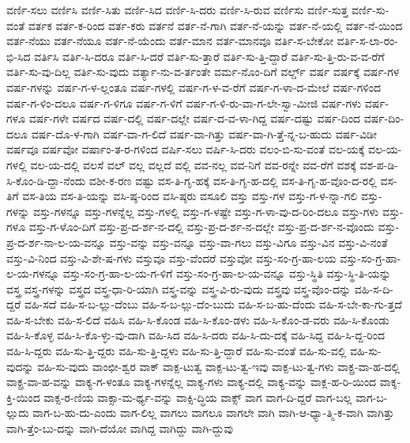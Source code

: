 {ವರ್ಣಿ-ಸಲು
ವರ್ಣಿಸಿ
ವರ್ಣಿ-ಸಿತು
ವರ್ಣಿ-ಸಿದ
ವರ್ಣಿ-ಸಿ-ದರು
ವರ್ಣಿ-ಸಿ-ರುವ
ವರ್ಣಿಸು
ವರ್ಣಿ-ಸುತ್ತ
ವರ್ಣಿ-ಸು-ವಂತೆ
ವರ್ತಕ
ವರ್ತ-ಕ-ರಿಂದ
ವರ್ತ-ಕರು
ವರ್ತನೆ
ವರ್ತ-ನೆ-ಗಾಗಿ
ವರ್ತ-ನೆ-ಯನ್ನು
ವರ್ತ-ನೆ-ಯಲ್ಲಿ
ವರ್ತ-ನೆ-ಯಿಂದ
ವರ್ತ-ನೆಯು
ವರ್ತ-ನೆಯೂ
ವರ್ತ-ನೆ-ಯೆಂದು
ವರ್ತ-ಮಾನ
ವರ್ತ-ಮಾನವೂ
ವರ್ತಿ-ಸ-ಬೇಕೋ
ವರ್ತಿ-ಸ-ಲಾ-ರಂ-ಭಿ-ಸಿದ
ವರ್ತಿಸಿ
ವರ್ತಿ-ಸಿ-ದರೂ
ವರ್ತಿ-ಸಿ-ದರೆ
ವರ್ತಿ-ಸು-ತ್ತಾರೆ
ವರ್ತಿ-ಸು-ತ್ತಿ-ದ್ದಾರೆ
ವರ್ತಿ-ಸು-ತ್ತಿ-ರು-ವ-ವ-ರೆಗೆ
ವರ್ತಿ-ಸು-ವು-ದಿಲ್ಲ
ವರ್ತಿ-ಸು-ವುದು
ವರ್ತ್ಯಾ-ನು-ವ-ರ್ತಂತೇ
ವರ್ಮ-ನೊಂ-ದಿಗೆ
ವರ್ಲ್ಡ್
ವರ್ಷ
ವರ್ಷಕ್ಕೆ
ವರ್ಷ-ಗಳ
ವರ್ಷ-ಗಳನ್ನು
ವರ್ಷ-ಗ-ಳ-ಲ್ಲಂತೂ
ವರ್ಷ-ಗಳಲ್ಲಿ
ವರ್ಷ-ಗ-ಳ-ವ-ರೆಗೆ
ವರ್ಷ-ಗ-ಳಾ-ದ-ಮೇಲೆ
ವರ್ಷ-ಗಳಿಂದ
ವರ್ಷ-ಗ-ಳಿಂ-ದಲೂ
ವರ್ಷ-ಗ-ಳಿಗೂ
ವರ್ಷ-ಗ-ಳಿಗೆ
ವರ್ಷ-ಗ-ಳಿ-ರು-ವಾ-ಗ-ಲೇ-ಸ್ವಾ-ಮೀಜಿ
ವರ್ಷ-ಗಳು
ವರ್ಷ-ಗಳೂ
ವರ್ಷ-ಗಳೇ
ವರ್ಷದ
ವರ್ಷ-ದಲ್ಲಿ
ವರ್ಷ-ದಲ್ಲೇ
ವರ್ಷ-ದ-ವ-ಳಾ-ಗಿದ್ದ
ವರ್ಷ-ದಷ್ಟು
ವರ್ಷ-ದಿಂದ
ವರ್ಷ-ದಿಂ-ದಲೂ
ವರ್ಷ-ದೊ-ಳ-ಗಾಗಿ
ವರ್ಷ-ವಾ-ಗ-ಲಿದೆ
ವರ್ಷ-ವಾ-ಗಿತ್ತು
ವರ್ಷ-ವಾ-ಗಿ-ತ್ತೆ-ನ್ನ-ಬ-ಹುದು
ವರ್ಷ-ವಿಡೀ
ವರ್ಷವೂ
ವರ್ಷವೋ
ವರ್ಷಾಂ-ತ-ರ-ಗಳಿಂದ
ವರ್ಷಿ-ಸಲು
ವರ್ಷಿ-ಸಿ-ದರು
ವಲಂ-ಬಿ-ಸು-ವಂತೆ
ವಲ-ಯಕ್ಕೆ
ವಲ-ಯ-ಗಳಲ್ಲಿ
ವಲ-ಯ-ದಲ್ಲಿ
ವಲಸೆ
ವಲ್
ವಲ್ಲ
ವಲ್ಲದೆ
ವಲ್ಲಿ
ವವ-ನಲ್ಲ
ವವ-ನಿಗೆ
ವವ-ರನ್ನೇ
ವವ-ರೆಗೆ
ವಶಕ್ಕೆ
ವಶ-ಪ-ಡಿ-ಸಿ-ಕೊಂ-ಡಿ-ದ್ದಾ-ನೆಂದು
ವಶೀ-ಕ-ರಣ
ವಷ್ಟು
ವಸ-ತಿ-ಗೃ-ಹಕ್ಕೆ
ವಸ-ತಿ-ಗೃ-ಹ-ದಲ್ಲಿ
ವಸ-ತಿ-ಗೃ-ಹ-ವೊಂ-ದ-ರಲ್ಲಿ
ವಸ-ತಿಗೆ
ವಸ-ತಿಯ
ವಸ-ತಿ-ಯನ್ನು
ವಸಿ-ಷ್ಠ-ರಿಂದ
ವಸಿ-ಷ್ಠರು
ವಸೂಲಿ
ವಸ್ತು
ವಸ್ತು-ಗಳ
ವಸ್ತು-ಗ-ಳ-ನ್ನಾ-ಗಲಿ
ವಸ್ತು-ಗಳನ್ನು
ವಸ್ತು-ಗಳನ್ನೂ
ವಸ್ತು-ಗಳನ್ನೆಲ್ಲ
ವಸ್ತು-ಗಳಲ್ಲಿ
ವಸ್ತು-ಗ-ಳಷ್ಟೇ
ವಸ್ತು-ಗ-ಳಾ-ವು-ದ-ರಿಂ-ದಲೂ
ವಸ್ತು-ಗಳು
ವಸ್ತು-ಗಳೂ
ವಸ್ತು-ಗ-ಳೊಂ-ದಿಗೆ
ವಸ್ತು-ಪ್ರ-ದ-ರ್ಶ-ನ-ದಲ್ಲಿ
ವಸ್ತು-ಪ್ರ-ದ-ರ್ಶ-ನ-ದಲ್ಲೇ
ವಸ್ತು-ಪ್ರ-ದ-ರ್ಶ-ನ-ವೊಂದು
ವಸ್ತು-ಪ್ರ-ದ-ರ್ಶ-ನಾ-ಲ-ಯ-ವನ್ನೂ
ವಸ್ತು-ವನ್ನು
ವಸ್ತು-ವನ್ನೂ
ವಸ್ತು-ವಾ-ಗಲು
ವಸ್ತು-ವಿಗೂ
ವಸ್ತು-ವಿನ
ವಸ್ತು-ವಿ-ನಂತೆ
ವಸ್ತು-ವಿ-ನಿಂದ
ವಸ್ತು-ವಿ-ಶೇ-ಷ-ಗಳು
ವಸ್ತುವೂ
ವಸ್ತು-ವೆಂದರೆ
ವಸ್ತುವೋ
ವಸ್ತು-ಸಂ-ಗ್ರ-ಹಾ-ಲಯ
ವಸ್ತು-ಸಂ-ಗ್ರ-ಹಾ-ಲ-ಯ-ಗಳನ್ನೂ
ವಸ್ತು-ಸಂ-ಗ್ರ-ಹಾ-ಲ-ಯ-ಗ-ಳಿಗೆ
ವಸ್ತು-ಸಂ-ಗ್ರ-ಹಾ-ಲ-ಯ-ವನ್ನೂ
ವಸ್ತು-ಸ್ಥಿತಿ
ವಸ್ತು-ಸ್ಥಿ-ತಿ-ಯನ್ನು
ವಸ್ತ್ರ
ವಸ್ತ್ರ-ಗಳನ್ನು
ವಸ್ತ್ರದ
ವಸ್ತ್ರ-ಧಾ-ರಿ-ಯಾಗಿ
ವಸ್ತ್ರ-ವನ್ನು
ವಸ್ತ್ರ-ವಿ-ರು-ವುದು
ವಸ್ತ್ರವು
ವಸ್ತ್ರ-ವೊಂ-ದನ್ನು
ವಹಿ-ಸ-ದಿ-ದ್ದರೆ
ವಹಿ-ಸದೆ
ವಹಿ-ಸ-ಬ-ಲ್ಲು-ದೆಂಬು
ವಹಿ-ಸ-ಬ-ಲ್ಲು-ದೆಂ-ಬುದು
ವಹಿ-ಸ-ಬ-ಹು-ದೆಂದು
ವಹಿ-ಸ-ಬೇ-ಕಾ-ಗು-ತ್ತದೆ
ವಹಿ-ಸ-ಬೇಕು
ವಹಿ-ಸ-ಲಿದೆ
ವಹಿಸಿ
ವಹಿ-ಸಿ-ಕೊಂಡ
ವಹಿ-ಸಿ-ಕೊಂ-ಡಳು
ವಹಿ-ಸಿ-ಕೊಂ-ಡ-ವರು
ವಹಿ-ಸಿ-ಕೊಂಡು
ವಹಿ-ಸಿ-ಕೊಳ್ಳ
ವಹಿ-ಸಿ-ಕೊ-ಳ್ಳು-ವು-ದಾಗಿ
ವಹಿ-ಸಿದ
ವಹಿ-ಸಿ-ದರು
ವಹಿ-ಸಿ-ದು-ದಕ್ಕೆ
ವಹಿ-ಸಿದ್ದ
ವಹಿ-ಸಿ-ದ್ದ-ರಿಂದ
ವಹಿ-ಸಿ-ದ್ದರು
ವಹಿ-ಸು-ತ್ತಿ-ದ್ದರು
ವಹಿ-ಸು-ತ್ತಿ-ದ್ದಳು
ವಹಿ-ಸು-ತ್ತಿ-ದ್ದಾರೆ
ವಹಿ-ಸು-ವಂತೆ
ವಹಿ-ಸು-ವಲ್ಲಿ
ವಹಿ-ಸು-ವುದನ್ನು
ವಹಿ-ಸು-ವುದು
ವಾಂಛೀ-ಶ್ವರ
ವಾಕ್
ವಾಕ್ಪ-ಟುತ್ವ
ವಾಕ್ಪ-ಟು-ತ್ವ-ಇವು
ವಾಕ್ಪ-ಟು-ತ್ವ-ಗಳು
ವಾಕ್ಪ್ರ-ವಾ-ಹ-ದಲ್ಲಿ
ವಾಕ್ಪ್ರ-ವಾ-ಹ-ವನ್ನು
ವಾಕ್ಯ-ಗ-ಳಂತೂ
ವಾಕ್ಯ-ಗಳನ್ನೆಲ್ಲ
ವಾಕ್ಯ-ಗಳು
ವಾಕ್ಯ-ದಲ್ಲಿ
ವಾಕ್ಯ-ವನ್ನು
ವಾಕ್ಲ-ಹ-ರಿ-ಯಿಂದ
ವಾಕ್ಶ-ಕ್ತಿ-ಯಿಂದ
ವಾಕ್ಸ-ರ-ಣಿಯ
ವಾಕ್ಸಾ-ಮ-ರ್ಥ್ಯ-ವನ್ನು
ವಾಕ್ಸಿ-ದ್ಧಿಯ
ವಾಕ್ಸ್
ವಾಗ
ವಾಗ-ದಿ-ದ್ದರೆ
ವಾಗ-ಬಲ್ಲ
ವಾಗ-ಬ-ಲ್ಲುದು
ವಾಗ-ಬ-ಹು-ದು-ಎಂದು
ವಾಗ-ಲಿಲ್ಲ
ವಾಗಲು
ವಾಗಲೂ
ವಾಗಲೇ
ವಾಗಿ
ವಾಗಿ-ಆ-ಧ್ಯಾ-ತ್ಮಿ-ಕ-ವಾಗಿ
ವಾಗಿತ್ತು
ವಾಗಿ-ತ್ತೆಂ-ಬು-ದನ್ನು
ವಾಗಿ-ದೆಯೋ
ವಾಗಿದ್ದ
ವಾಗಿದ್ದು
ವಾಗಿ-ದ್ದುವು
}
